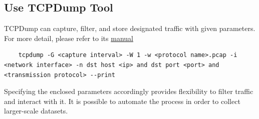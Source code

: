 \subsection{Use TCPDump \cite{tcpdump} Tool}
\begin{frame}[fragile]
    TCPDump can capture, filter, and store designated traffic with given parameters. For more detail, please refer to its \href{https://www.tcpdump.org/}{manual}
   \lstset{language=bash, basicstyle=\small \ttfamily, showspaces=false,   showtabs=false, tab= , keywordstyle=\bfseries,     showstringspaces=false, framexleftmargin=5mm, frame=single,     numbers=left,
    numberstyle=\tiny,
    stepnumber=1,
    numbersep=5pt,
    texcl=true, 
    breaklines=true,
    breakatwhitespace=true,
    keepspaces=true,
    columns=fullflexible,}
    \begin{lstlisting}
    tcpdump -G <capture interval> -W 1 -w <protocol name>.pcap -i <network interface> -n dst host <ip> and dst port <port> and <transmission protocol> --print
    \end{lstlisting}
    Specifying the enclosed parameters accordingly provides flexibility to filter traffic and interact with it.
    It is possible to automate the process in order to collect larger-scale datasets.
\end{frame}


